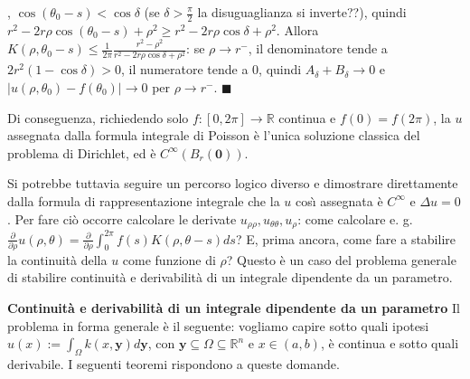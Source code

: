 \documentclass{article}
\begin{document}
, $\cos \left( \theta _{0}-s\right) <\cos \delta $ (se $\delta >\frac{\pi }{2%
}$ la disuguaglianza si inverte??), quindi $r^{2}-2r\rho \cos \left( \theta
_{0}-s\right) +\rho ^{2}\geq r^{2}-2r\rho \cos \delta +\rho ^{2}$. Allora $%
K\left( \rho ,\theta _{0}-s\right) \leq \frac{1}{2\pi }\frac{r^{2}-\rho ^{2}%
}{r^{2}-2r\rho \cos \delta +\rho ^{2}}$: se $\rho \rightarrow r^{-}$, il
denominatore tende a $2r^{2}\left( 1-\cos \delta \right) >0$, il numeratore
tende a $0$, quindi $A_{\delta }+B_{\delta }\rightarrow 0$ e $\left\vert
u\left( \rho ,\theta _{0}\right) -f\left( \theta _{0}\right) \right\vert
\rightarrow 0$ per $\rho \rightarrow r^{-}$. $\blacksquare $

Di conseguenza, richiedendo solo $f:\left[ 0,2\pi \right] \rightarrow 
\mathbb{R}
$ continua e $f\left( 0\right) =f\left( 2\pi \right) $, la $u$ assegnata
dalla formula integrale di Poisson \`{e} l'unica soluzione classica del
problema di Dirichlet, ed \`{e} $C^{\infty }\left( B_{r}\left( \mathbf{0}%
\right) \right) $.

Si potrebbe tuttavia seguire un percorso logico diverso e dimostrare
direttamente dalla formula di rappresentazione integrale che la $u$ cos\`{\i}
assegnata \`{e} $C^{\infty }$ e $\Delta u=0$. Per fare ci\`{o} occorre
calcolare le derivate $u_{\rho \rho },u_{\theta \theta },u_{\rho }$: come
calcolare e. g. $\frac{\partial }{\partial \rho }u\left( \rho ,\theta
\right) =\frac{\partial }{\partial \rho }\int_{0}^{2\pi }f\left( s\right)
K\left( \rho ,\theta -s\right) ds$? E, prima ancora, come fare a stabilire
la continuit\`{a} della $u$ come funzione di $\rho $? Questo \`{e} un caso
del problema generale di stabilire continuit\`{a} e derivabilit\`{a} di un
integrale dipendente da un parametro.

\textbf{Continuit\`{a} e derivabilit\`{a} di un integrale dipendente da un
parametro} Il problema in forma generale \`{e} il seguente: vogliamo capire
sotto quali ipotesi $u\left( x\right) :=\int_{\Omega }k\left( x,\mathbf{y}%
\right) d\mathbf{y}$, con $\mathbf{y}\subseteq \Omega \subseteq 
\mathbb{R}
^{n}$ e $x\in \left( a,b\right) $, \`{e} continua e sotto quali derivabile.
I seguenti teoremi rispondono a queste domande.
\end{document}
